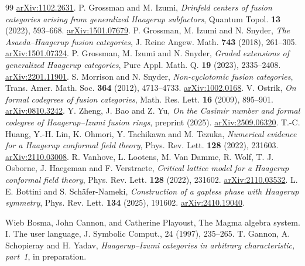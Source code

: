 \documentclass[11pt]{article}
\numberwithin{equation}{section}
\theoremstyle{definition}
\theoremstyle{remark}
\begin{document}
\begin{thebibliography}{99}
\href{https://arxiv.org/abs/1102.2631}{arXiv:1102.2631}.
P. Grossman and M. Izumi, \emph{Drinfeld centers of fusion categories
arising from generalized Haagerup subfactors}, Quantum Topol.
\textbf{13} (2022), 593--668.
\href{https://arxiv.org/abs/1501.07679}{arXiv:1501.07679}.
P. Grossman, M. Izumi and N. Snyder, \emph{The Asaeda--Haagerup fusion
categories}, J. Reine Angew. Math. \textbf{743} (2018), 261--305.
\href{https://arxiv.org/abs/1501.07324}{arXiv:1501.07324}.
P. Grossman, M. Izumi and N. Snyder, \emph{Graded extensions of
generalized Haagerup categories}, Pure Appl. Math. Q. \textbf{19}
(2023), 2335--2408.
\href{https://arxiv.org/abs/2201.11901}{arXiv:2201.11901}.
S. Morrison and N. Snyder, \emph{Non-cyclotomic fusion categories},
Trans. Amer. Math. Soc. \textbf{364} (2012), 4713--4733.
\href{https://arxiv.org/abs/1002.0168}{arXiv:1002.0168}.
V. Ostrik, \emph{On formal codegrees of fusion categories}, Math. Res.
Lett. \textbf{16} (2009), 895--901.
\href{https://arxiv.org/abs/0810.3242}{arXiv:0810.3242}.
Y. Zheng, J. Bao and Z. Yu, \emph{On the Casimir number and formal
codegree of Haagerup--Izumi fusion rings}, preprint (2025).
\href{https://arxiv.org/abs/2509.06320}{arXiv:2509.06320}.
T.-C. Huang, Y.-H. Lin, K. Ohmori, Y. Tachikawa and M. Tezuka,
\emph{Numerical evidence for a Haagerup conformal field theory}, Phys.
Rev. Lett. \textbf{128} (2022), 231603.
\href{https://arxiv.org/abs/2110.03008}{arXiv:2110.03008}.
R. Vanhove, L. Lootens, M. Van Damme, R. Wolf, T. J. Osborne,
J. Haegeman and F. Verstraete, \emph{Critical lattice model for a
Haagerup conformal field theory}, Phys. Rev. Lett. \textbf{128} (2022),
231602. \href{https://arxiv.org/abs/2110.03532}{arXiv:2110.03532}.
L. E. Bottini and S. Sch\"afer-Nameki, \emph{Construction of a gapless
phase with Haagerup symmetry}, Phys. Rev. Lett. \textbf{134} (2025),
191602. \href{https://arxiv.org/abs/2410.19040}{arXiv:2410.19040}.

 Wieb Bosma, John Cannon, and Catherine Playoust, The Magma algebra system. I. The user language, J. Symbolic Comput., 24 (1997), 235–265. 
T. Gannon, A. Schopieray and H. Yadav,
\emph{Haagerup--Izumi categories in arbitrary characteristic, part~1},
in preparation.
\end{thebibliography}
\end{document}
